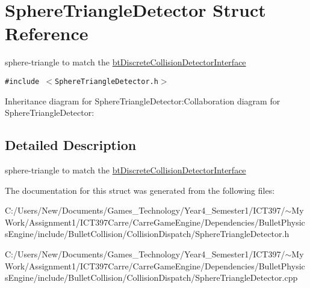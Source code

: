 \hypertarget{struct_sphere_triangle_detector}{
\section{SphereTriangleDetector Struct Reference}
\label{struct_sphere_triangle_detector}
}
sphere-triangle to match the \hyperlink{structbt_discrete_collision_detector_interface}{btDiscreteCollisionDetectorInterface}  


{\tt \#include $<$SphereTriangleDetector.h$>$}

Inheritance diagram for SphereTriangleDetector:Collaboration diagram for SphereTriangleDetector:

\subsection{Detailed Description}
sphere-triangle to match the \hyperlink{structbt_discrete_collision_detector_interface}{btDiscreteCollisionDetectorInterface} 

The documentation for this struct was generated from the following files:\begin{CompactItemize}
\item 
C:/Users/New/Documents/Games\_\-Technology/Year4\_\-Semester1/ICT397/$\sim$My Work/Assignment1/ICT397Carre/CarreGameEngine/Dependencies/BulletPhysicsEngine/include/BulletCollision/CollisionDispatch/SphereTriangleDetector.h\item 
C:/Users/New/Documents/Games\_\-Technology/Year4\_\-Semester1/ICT397/$\sim$My Work/Assignment1/ICT397Carre/CarreGameEngine/Dependencies/BulletPhysicsEngine/include/BulletCollision/CollisionDispatch/SphereTriangleDetector.cpp\end{CompactItemize}
